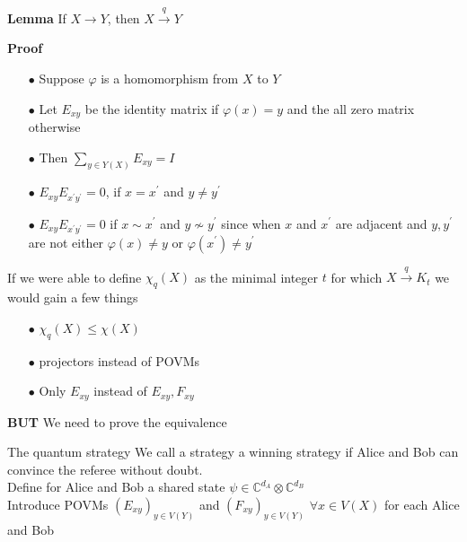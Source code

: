 \documentclass[13.5pt]{beamer}
\begin{document}
\begin{frame}
\begin{block}{\color{colorblue}\textbf{Lemma}}
If $X \longrightarrow Y$, then $X \overset{q}{\longrightarrow}Y$\\
\end{block}
\begin{block}{\color{colororange}\textbf{Proof}}
\begin{itemize}
\item[$\bullet$] Suppose $\varphi$ is a homomorphism from $X$ to $Y$ \pause
\item[$\bullet$] Let $E_{xy}$ be the identity matrix if $\varphi(x)=y$ and the all zero matrix otherwise\pause
\item[$\bullet$] Then $\sum_{y \in Y(X)}E_{xy} =I$\pause
\item[$\bullet$] $E_{xy}E_{x^{\prime}y^{\prime}} =0$, if $x=x^\prime$ and $y \ne y^\prime$ \pause
\item[$\bullet$] $E_{xy}E_{x^{\prime}y^{\prime}} =0$ if $ x \sim x^\prime$ and $y \nsim y^\prime$ since when $x$ and $x^\prime$ are adjacent and $y, y^\prime$ are not either $\varphi(x)\ne y$ or $\varphi(x^\prime)\ne y^\prime$
\end{itemize}
\end{block}
\end{frame}

\begin{frame}
If we were able to define $\chi_q(X)$ as the minimal integer $t$ for which $X \overset{q}{\longrightarrow} K_t$ we would gain a few things\vspace{0.5cm}
\pause
\begin{itemize}
\item[$\bullet$] $\chi_q(X) \le \chi(X)$ \pause
\item[$\bullet$] projectors instead of POVMs \pause
\item[$\bullet$] Only $E_{xy}$ instead of $E_{xy}, F_{xy}$ \pause
\end{itemize}
\pause
\begin{block}{\color{colororange}\textbf{BUT}}
\vspace{0.5cm}
We need to prove the equivalence

\end{block}
\end{frame}

\begin{frame}{The quantum strategy}
We call a strategy a winning strategy if Alice and Bob can convince the referee without doubt.\\\vspace{0.3cm} \pause
Define for Alice and Bob a shared state $\psi \in \mathbb{C}^{d_A} \otimes \mathbb{C}^{d_B}$\\\vspace{0.3cm} \pause
Introduce POVMs $(E_{xy})_{y\in V(Y)}$ and $(F_{xy})_{y\in V(Y)}$ $\forall x \in V(X)$ for each Alice and Bob \\\vspace{0.3cm}
\end{frame}
\end{document}
